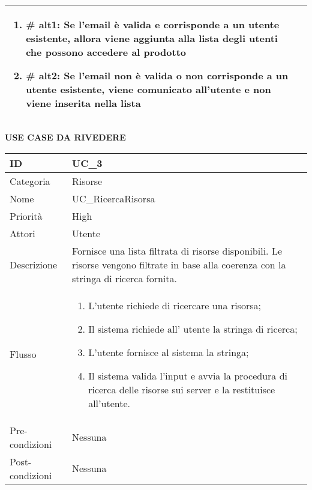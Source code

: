 \begin{center}
\begin{tabular}{ |p{2cm}|p{13cm}|  }
\begin{enumerate}
\begin{enumerate}[  ]
\begin{enumerate}[label*=\arabic*.]
							\begin{enumerate}[label*=\arabic*.]
								\item \textbf{\# alt1:} Se l'email è valida e corrisponde a un utente esistente, allora viene aggiunta alla lista degli utenti che possono accedere al prodotto
								\item \textbf{\# alt2:} Se l'email non è valida o non corrisponde a un utente esistente, viene comunicato all'utente e non viene inserita nella lista
							\end{enumerate}
					\end{enumerate}
				\end{enumerate}
		\end{enumerate}\\\hline
\end{tabular}
\label{table_use_case:21}\newline




\textbf{USE CASE DA RIVEDERE} \newline


\begin{tabular}{ |p{2cm}|p{13cm}|  }
\hline
ID & UC\_3 \\\hline
Categoria & Risorse \\\hline
Nome & UC\_RicercaRisorsa\\\hline
Priorità & High \\\hline
Attori &  Utente \\\hline
Descrizione & Fornisce una lista filtrata di risorse disponibili. Le risorse vengono filtrate in base alla coerenza con la stringa di ricerca fornita.\\\hline
Flusso &  	\begin{enumerate}
			\item L'utente richiede di ricercare una risorsa;
			\item Il sistema richiede all' utente la stringa di ricerca;
			\item L'utente fornisce al sistema la stringa;
			\item Il sistema valida l'input e avvia la procedura di ricerca delle risorse sui server e la restituisce all'utente. %
			
		\end{enumerate}\\\hline
Pre-condizioni &  Nessuna\\\hline
Post-condizioni &  Nessuna\\\hline
\end{tabular}
\label{table_use_case:3}\newline



\end{center}
